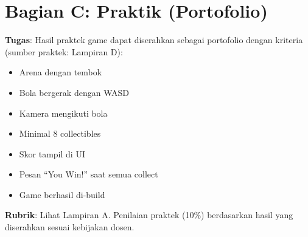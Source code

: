\section{Bagian C: Praktik (Portofolio)}

\textbf{Tugas}: Hasil praktek game dapat diserahkan sebagai portofolio dengan kriteria (sumber praktek: Lampiran D):
\begin{itemize}
  \item Arena dengan tembok
  \item Bola bergerak dengan WASD
  \item Kamera mengikuti bola
  \item Minimal 8 collectibles
  \item Skor tampil di UI
  \item Pesan ``You Win!'' saat semua collect
  \item Game berhasil di-build
\end{itemize}

\textbf{Rubrik}: Lihat Lampiran A. Penilaian praktek (10\%) berdasarkan hasil yang diserahkan sesuai kebijakan dosen.
